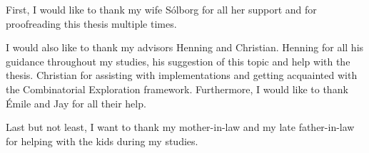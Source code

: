 First, I would like to thank my wife Sólborg for all her support and for proofreading this thesis multiple times.

I would also like to thank my advisors Henning and Christian. Henning for all his guidance throughout my studies, his suggestion of this topic and help with the thesis. Christian for assisting with implementations and getting acquainted with the Combinatorial Exploration framework. Furthermore, I would like to thank Émile and Jay for all their help.

Last but not least, I want to thank my mother-in-law and my late father-in-law for helping with the kids during my studies.
